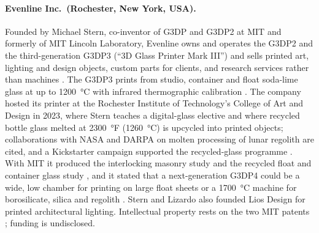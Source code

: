 \paragraph{Evenline Inc.\ (Rochester, New York, USA).} Founded by Michael Stern, co-inventor of G3DP and G3DP2 at MIT and formerly of MIT Lincoln Laboratory, Evenline owns and operates the G3DP2 and the third-generation G3DP3 (``3D Glass Printer Mark III'') and sells printed art, lighting and design objects, custom parts for clients, and research services rather than machines \citep{evenline_web,acers2024recent,threednatives2025}. The G3DP3 prints  from studio, container and float soda-lime glass at up to \SI{1200}{\celsius} with infrared thermographic calibration \citep{mit2024masonry,stern2024cgc}. The company hosted its printer at the Rochester Institute of Technology's College of Art and Design in 2023, where Stern teaches a digital-glass elective and where recycled bottle glass melted at \SI{2300}{\degree}F (\SI{1260}{\celsius}) is upcycled into printed objects; collaborations with NASA and DARPA on molten processing of lunar regolith are cited, and a Kickstarter campaign supported the recycled-glass programme \citep{rit2023}. With MIT it produced the interlocking masonry study \citep{mit2024masonry,mitnews2024bricks} and the recycled float and container glass study \citep{stern2024cgc}, and it stated that a next-generation G3DP4 could be a wide, low chamber for printing on large float sheets or a \SI{1700}{\celsius} machine for borosilicate, silica and regolith \citep{stern2024cgc}. Stern and Lizardo also founded Lios Design for printed architectural lighting. Intellectual property rests on the two MIT patents \citep{patent_us9919510,patent_us10464305,patent_us10266442}; funding is undisclosed.

